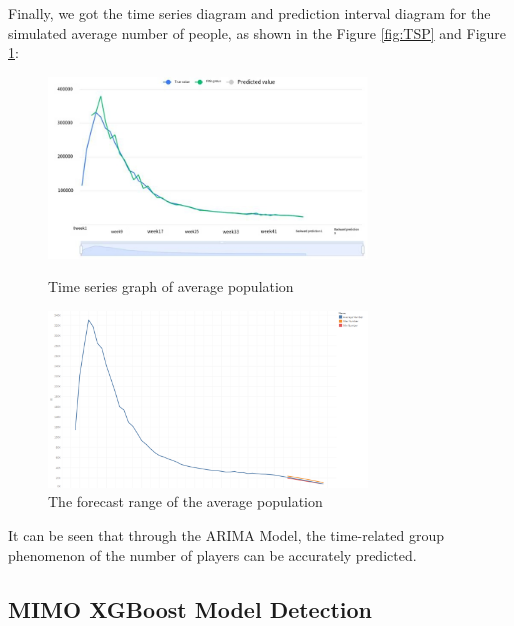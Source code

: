 \documentclass[a4paper]{jpconf}
\begin{document}
Finally, we got the time series diagram and prediction interval diagram for the simulated average number of people, as shown in the Figure \ref{fig:TSP} and Figure \ref{fig:end}:

\begin{figure}[h]
\begin{minipage}{20pc}
\includegraphics[width=20pc]{img/TSP.png}
\caption{\label{fig:TSP}Time series graph of average population}
\end{minipage}\hspace{2pc}%
\begin{minipage}{20pc}
\includegraphics[width=20pc]{img/end.png}
\caption{\label{fig:end}The forecast range of the average population}
\end{minipage} 
\end{figure}




It can be seen that through the ARIMA Model, the time-related group phenomenon of the number of players can be accurately predicted.




\subsection{MIMO XGBoost Model Detection}
\end{document}
